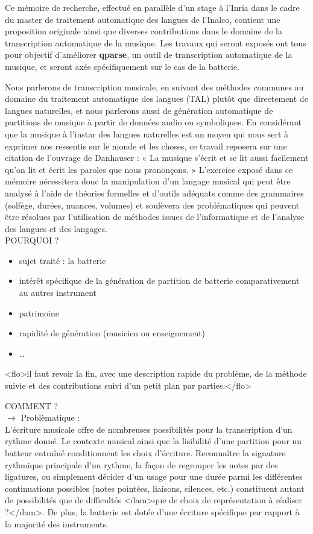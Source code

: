 Ce mémoire de recherche, effectué en parallèle d’un stage à l’Inria dans le
cadre du master de traitement automatique des langues de l’Inalco, contient
une proposition originale ainsi que diverses contributions dans le domaine de
la transcription automatique de la musique. Les travaux qui seront exposés ont
tous pour objectif d’améliorer \textbf{qparse}, un outil de transcription
automatique de la musique, et seront axés spécifiquement sur le cas de la
batterie.

Nous parlerons de transcription musicale, en suivant des méthodes communes au
domaine du traitement automatique des langues (TAL) plutôt que directement de
langues naturelles, et nous parlerons aussi de génération automatique de
partitions de musique à partir de données audio ou symboliques. En considérant
que la musique à l’instar des langues naturelles est un moyen qui nous sert à
exprimer nos ressentis sur le monde et les choses, ce travail reposera sur une
citation de l’ouvrage de Danhauser \cite{danhauser} : « La musique s’écrit et
se lit aussi facilement qu’on lit et écrit les paroles que nous prononçons. »
L’exercice exposé dans ce mémoire nécessitera donc la manipulation d’un langage
musical qui peut être analysé à l’aide de théories formelles et d’outils
adéquats comme des grammaires (solfège, durées, nuances, volumes) et
soulèvera des problématiques qui peuvent être résolues par l’utilisation de
méthodes issues de l’informatique et de l’analyse des langues et des
langages.\\

POURQUOI ?
\begin{itemize}
	\item sujet traité : la batterie
	\item intérêt spécifique de la génération de partition de batterie comparativement
  au autres instrument
	\item patrimoine
	\item rapidité de génération (musicien ou enseignement)
	\item …\\
\end{itemize}

<flo>il faut revoir la fin, avec une description rapide du problème, de la
méthode suivie et des contributions suivi d'un petit plan par parties.</flo> 


COMMENT ?\\
$\to$ Problèmatique :\\
L’écriture musicale offre de nombreuses possibilités pour la transcription d’un
rythme donné. Le contexte musical ainsi que la lisibilité d’une partition pour
un batteur entraîné conditionnent les choix d’écriture. Reconnaître la
signature rythmique principale d’un rythme, la façon de regrouper les notes par des
ligatures, ou simplement décider d’un usage pour une durée parmi les
différentes continuations possibles (notes pointées, liaisons, silences, etc.)
constituent autant de possibilités que de difficultés <dam>que de choix de
représentation à réaliser ?</dam>. De plus, la batterie est dotée d’une écriture
spécifique par rapport à la majorité des instruments.\\

